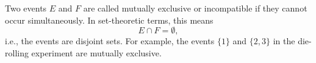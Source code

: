 Two events $E$ and $F$ are called mutually exclusive or incompatible if they cannot occur simultaneously. In set-theoretic terms, this means
$$E \cap F = \emptyset,$$
i.e., the events are disjoint sets. For example, the events $\{1\}$ and $\{2,3\}$ in the die-rolling experiment are mutually exclusive.
